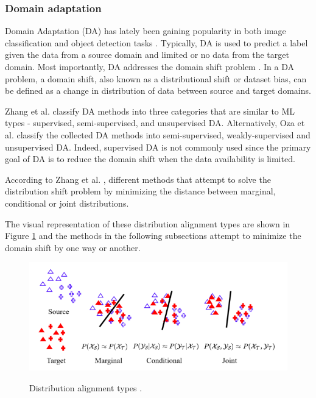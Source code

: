 \documentclass[english, 12pt, a4paper, elec, utf8, a-1b, online]{aaltothesis}
\begin{document}


\subsubsection{Domain adaptation}
\label{DA_section} 
Domain Adaptation (DA) has lately been gaining popularity in both image classification and object detection tasks \cite{Zhang2021}. Typically, DA is used to predict a label given the data from a source domain and limited or no data from the target domain. Most importantly, DA addresses the domain shift problem \cite{Zhang2021}. In a DA problem, a domain shift, also known as a distributional shift or dataset bias, can be defined as a change in distribution of data between source and target domains. 


Zhang et al. \cite{Zhang2021} classify DA methods into three categories that are similar to ML types - supervised, semi-supervised, and unsupervised DA. Alternatively, Oza et al. \cite{Oza2021} classify the collected DA methods into semi-supervised, weakly-supervised and unsupervised DA. Indeed, supervised DA is not commonly used since the primary goal of DA is to reduce the domain shift when the data availability is limited. 

According to Zhang et al. \cite{Zhang2021}, different methods that attempt to solve the distribution shift problem by minimizing the distance between marginal, conditional or joint distributions. 

The visual representation of these distribution alignment types are shown in Figure \ref{distribution} and the methods in the following subsections attempt to minimize the domain shift by one way or another. 

\begin{figure}[htb]
	\begin{center}
		\includegraphics[width=12cm]{./distribution.png}
	\end{center}
	\caption{Distribution alignment types \cite{Zhang2021}.}
	\begin{center}
		\label{distribution}
	\end{center}
\end{figure}
\FloatBarrier 
\end{document}
